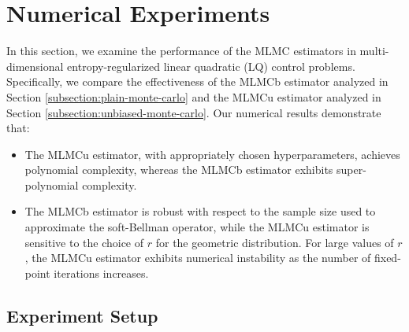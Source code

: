 \documentclass[11pt]{article}
\numberwithin{equation}{section}
\theoremstyle{definition}
\theoremstyle{remark}
\begin{document}
\section{Numerical Experiments}
\label{section:numerics}
In this section, we examine the performance of the MLMC estimators in multi-dimensional entropy-regularized linear quadratic (LQ) control problems. 
Specifically, we compare the effectiveness of the  MLMCb estimator analyzed in Section \ref{subsection:plain-monte-carlo} and the  MLMCu estimator analyzed in Section \ref{subsection:unbiased-monte-carlo}.\footnotemark 
Our numerical results demonstrate that:
\begin{itemize}
    \item The MLMCu estimator, with appropriately chosen hyperparameters, achieves polynomial complexity, whereas the MLMCb estimator exhibits super-polynomial complexity.

    \item
    The MLMCb estimator is robust with respect to  the sample size used to approximate the soft-Bellman operator, while the MLMCu estimator is sensitive to the choice of $r$
 for the geometric distribution. For large values of $r$, the MLMCu estimator exhibits numerical instability as the number of fixed-point iterations increases.

\end{itemize}

 



\subsection{Experiment Setup}
\label{subsection:experimental-setup}
\end{document}

